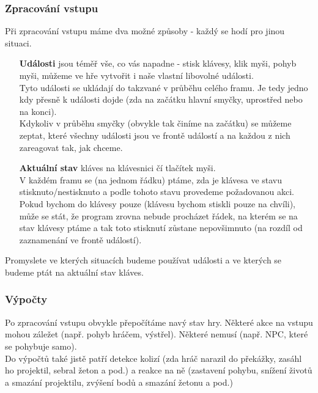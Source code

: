 \subsubsection{Zpracování vstupu}
Při zpracování vstupu máme dva možné způsoby - každý se hodí pro jinou situaci.
\begin{enumerate}
\item[\textbf{Události}] jsou téměř vše, co vás napadne - stisk klávesy, klik myši, pohyb myši, můžeme ve hře vytvořit i naše vlastní libovolné události.\\Tyto události se ukládají do takzvané  v průběhu celého framu. Je tedy jedno kdy přesně k události dojde (zda na začátku hlavní smyčky, uprostřed nebo na konci).\\Kdykoliv v průběhu smyčky (obvykle tak činíme na začátku) se můžeme zeptat, které všechny události jsou  ve frontě událostí a na každou z nich zareagovat tak, jak chceme.
\item[\textbf{Aktuální stav}] kláves na klávesnici čí tlačítek myši.\\V každém framu se (na jednom řádku) ptáme, zda je klávesa ve stavu stisknuto/nestisknuto a podle tohoto stavu provedeme požadovanou akci.\\Pokud bychom do klávesy pouze  (klávesu bychom stiskli pouze na chvíli), může se stát, že program zrovna nebude procházet řádek, na kterém se na stav klávesy ptáme a tak toto stisknutí zůstane nepovšimnuto (na rozdíl od zaznamenání ve frontě událostí). 
\end{enumerate}
Promyslete ve kterých situacích budeme používat události a ve kterých se budeme ptát na aktuální stav kláves.

\subsubsection{Výpočty}
Po zpracování vstupu obvykle přepočítáme navý stav hry. Některé akce na vstupu mohou záležet (např. pohyb hráčem, výstřel). Některé nemusí (např. NPC, které se pohybuje samo).\\
Do výpočtů také jistě patří detekce kolizí (zda hráč narazil do překážky, zasáhl ho projektil, sebral žeton a pod.) a reakce na ně (zastavení pohybu, snížení životů a smazání projektilu, zvýšení bodů a smazání žetonu a pod.)

